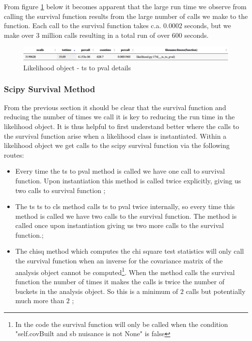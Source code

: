 From figure \ref{fig:ts_to_pval} below it becomes apparent that the large run time we observe from calling the survival function results from the large number of calls we make to the function. Each call to the survival function takes c.a. $0.0002$ seconds, but we make over $3$ million calls resulting in a total run of over $600$ seconds. 

\begin{figure}[H]
\centering
\includegraphics[scale=0.3]{plots/likelihood_count.png}
\caption{Likelihood object - ts to pval details}
\label{fig:ts_to_pval}
\end{figure}

\subsubsection{Scipy Survival Method}
From the previous section it should be clear that the survival function and reducing the number of times we call it is key to reducing the run time in the likelihood object. It is thus helpful to first understand better where the calls to the survival function arise when a likelihood class is instantiated. Within a likelihood object we get calls to the scipy survival function via the following routes:

\begin{itemize}
\item[1.] Every time the ts to pval method is called we have one call to survival function. Upon instantiation this method is called twice explicitly, giving us two calls to survival function ;
\item[2.]The ts ts to cls method calls ts to pval twice internally, so every time this method is called we have two calls to the survival function. The method is called once upon instantiation giving us two more calls to the survival function.;
\item[3.] The chisq method which computes the chi square test statistics will only call the survival function when an inverse for the covariance matrix of the analysis object cannot be computed\footnote{In the code the survival function will only be called when the condition "self.covBuilt and sb nuisance is not None" is false}. When the method calls the survival function the number of times it makes the calls is twice the number of buckets in the analysis object. So this is a minimum of $2$ calls but potentially much more than $2$ ;
\end{itemize}

